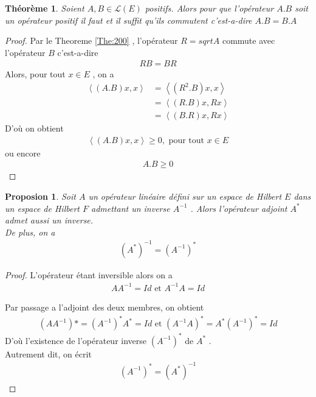 \documentclass{report}
\newtheorem{The}{Théorème}[subsection]
\newtheorem{Prop}{Proposion}[subsection]
\begin{document}
{\begin{The} Soient $A, B \in \mathscr{L}(E)$ positifs. Alors pour que l'opérateur $A.B$ soit un opérateur positif il faut et il suffit qu'ils commutent c'est-a-dire $A.B = B.A$ \\
\end{The}
\begin{proof}
Par le Theoreme \ref{The:200} , l'opérateur $R=sqrt{A}$ commute avec l'opérateur $B$ c'est-a-dire 
									\begin{align*}
					 RB = BR 
									\end{align*}
Alors, pour tout $x \in E$ , on a  
									\begin{align*}
					 \left< (A.B)x,x \right> &= \left< (R^2.B)x,x \right> \\
					 &= \left< (R.B)x,Rx \right> \\
					 &= \left< (B.R)x,Rx \right> 
									\end{align*}
D'où on obtient 
									\begin{align*}
					 \left< (A.B)x,x \right> \ge 0 ,     \,\,\text{pour tout}\,\, x \in E 
									\end{align*}
ou encore 
									\begin{align*}
					 A.B \ge 0 
									\end{align*}
\end{proof}


					 
\begin{Prop}Soit $A$ un opérateur linéaire défini sur un espace de Hilbert $E$ dans un espace de Hilbert $F$ admettant un inverse $A^{-1}$ . Alors l'opérateur adjoint $A^*$ admet aussi un inverse.\\
De plus, on a 
									\begin{align*}
					 (A^*)^{-1} = (A^{-1})^* 
									\end{align*}
\end{Prop}
\begin{proof}
L'opérateur étant inversible alors on a 
									\begin{align*}
					 A A^{-1} = Id      \,\,\text{et}\,\,     A^{-1} A = Id 
									\end{align*}



Par passage a l'adjoint des deux membres, on obtient 
									\begin{align*}
					 (A A^{-1})* = (A^{-1})^* A^* = Id  \,\,\text{et}\,\,    (A^{-1} A)^* = A^* (A^{-1})^* = Id 
									\end{align*}
D'où l'existence de l'opérateur inverse $(A^{-1})^*$ de $A^*$ .\\
Autrement dit, on écrit 
									\begin{align*}
					 (A^{-1})^* = (A^*)^{-1} 
									\end{align*}
\end{proof}



}
\end{document}
